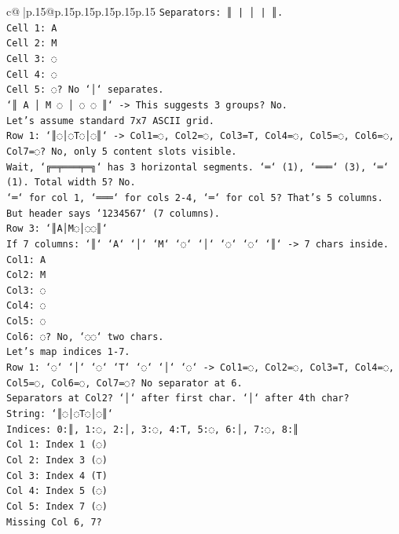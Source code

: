 \documentclass{article}
\begin{document}
{\begin{supertabular}{c@{$\;$}|p{.15\linewidth}@{}p{.15\linewidth}p{.15\linewidth}p{.15\linewidth}p{.15\linewidth}p{.15\linewidth}}
{{{\texttt{Separators: ║ | │ | ║.} \\
\texttt{Cell 1: A} \\
\texttt{Cell 2: M} \\
\texttt{Cell 3: ◌} \\
\texttt{Cell 4: ◌} \\
\texttt{Cell 5: ◌? No `│` separates.} \\
\texttt{`║ A │ M ◌ │ ◌ ◌ ║` {-}> This suggests 3 groups? No.} \\
\texttt{Let's assume standard 7x7 ASCII grid.} \\
\texttt{Row 1: `║◌│◌T◌│◌║` {-}> Col1=◌, Col2=◌, Col3=T, Col4=◌, Col5=◌, Col6=◌, Col7=◌? No, only 5 content slots visible.} \\
\texttt{Wait, `╔═╤═══╤═╗` has 3 horizontal segments. `═` (1), `═══` (3), `═` (1). Total width 5? No.} \\
\texttt{`═` for col 1, `═══` for cols 2{-}4, `═` for col 5? That's 5 columns.} \\
\texttt{But header says `1234567` (7 columns).} \\
\texttt{Row 3: `║A│M◌│◌◌║`} \\
\texttt{If 7 columns: `║` `A` `│` `M` `◌` `│` `◌` `◌` `║` {-}> 7 chars inside.} \\
\texttt{Col1: A} \\
\texttt{Col2: M} \\
\texttt{Col3: ◌} \\
\texttt{Col4: ◌} \\
\texttt{Col5: ◌} \\
\texttt{Col6: ◌? No, `◌◌` two chars.} \\
\texttt{Let's map indices 1{-}7.} \\
\texttt{Row 1: `◌` `│` `◌` `T` `◌` `│` `◌` {-}> Col1=◌, Col2=◌, Col3=T, Col4=◌, Col5=◌, Col6=◌, Col7=◌? No separator at 6.} \\
\texttt{Separators at Col2? `│` after first char. `│` after 4th char?} \\
\texttt{String: `║◌│◌T◌│◌║`} \\
\texttt{Indices: 0:║, 1:◌, 2:│, 3:◌, 4:T, 5:◌, 6:│, 7:◌, 8:║} \\
\texttt{Col 1: Index 1 (◌)} \\
\texttt{Col 2: Index 3 (◌)} \\
\texttt{Col 3: Index 4 (T)} \\
\texttt{Col 4: Index 5 (◌)} \\
\texttt{Col 5: Index 7 (◌)} \\
\texttt{Missing Col 6, 7?} \\
}}}
\end{supertabular}}
\end{document}
